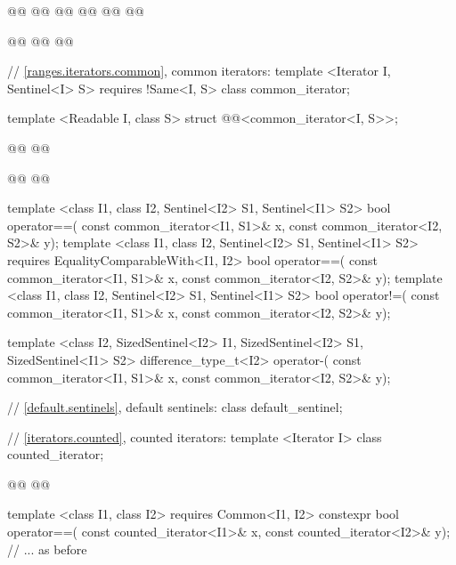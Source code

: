 \begin{codeblock}
{{    @@
      @@
        @@
    @@
      @@
        @@

    @@
    @@
      @@

    // \ref{ranges.iterators.common}, common iterators:
    template <Iterator I, Sentinel<I> S>
      requires !Same<I, S>
    class common_iterator;

    template <Readable I, class S>
    struct @@<common_iterator<I, S>>;

    @@
    @@

    @@
    @@

    template <class I1, class I2, Sentinel<I2> S1, Sentinel<I1> S2>
    bool operator==(
      const common_iterator<I1, S1>& x, const common_iterator<I2, S2>& y);
    template <class I1, class I2, Sentinel<I2> S1, Sentinel<I1> S2>
      requires EqualityComparableWith<I1, I2>
    bool operator==(
      const common_iterator<I1, S1>& x, const common_iterator<I2, S2>& y);
    template <class I1, class I2, Sentinel<I2> S1, Sentinel<I1> S2>
    bool operator!=(
      const common_iterator<I1, S1>& x, const common_iterator<I2, S2>& y);

    template <class I2, SizedSentinel<I2> I1, SizedSentinel<I2> S1, SizedSentinel<I1> S2>
    difference_type_t<I2> operator-(
      const common_iterator<I1, S1>& x, const common_iterator<I2, S2>& y);

    // \ref{default.sentinels}, default sentinels:
    class default_sentinel;

    // \ref{iterators.counted}, counted iterators:
    template <Iterator I> class counted_iterator;

    @@
      @@

    template <class I1, class I2>
        requires Common<I1, I2>
      constexpr bool operator==(
        const counted_iterator<I1>& x, const counted_iterator<I2>& y);
    // ... as before

}}
\end{codeblock}
